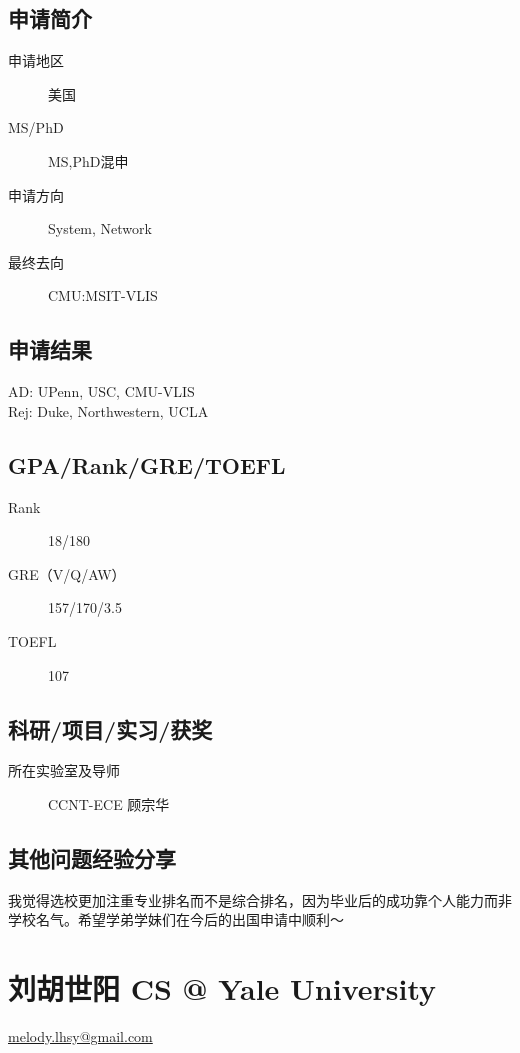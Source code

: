 \documentclass[11pt,fleqn,openany]{book} %
\begin{document}
\noindent\begin{minipage}[t]{0.45\textwidth}
\subsection*{申请简介}
\begin{description}
\item[申请地区] 美国
\item[MS/PhD] MS,PhD混申
\item[申请方向] System, Network
\item[最终去向] CMU:MSIT-VLIS
\end{description}
\end{minipage}
\hfill
\begin{minipage}[t]{0.45\textwidth}
\subsection*{申请结果}
\noindent AD: UPenn, USC, CMU-VLIS\\
Rej: Duke, Northwestern, UCLA
\end{minipage}
\subsection*{GPA/Rank/GRE/TOEFL}
\begin{description}
\item[Rank] 18/180
\item[GRE（V/Q/AW）] 157/170/3.5
\item[TOEFL] 107
\end{description}

\subsection*{科研/项目/实习/获奖}
\begin{description}
\item[所在实验室及导师] CCNT-ECE 顾宗华
\end{description}
\subsection*{其他问题经验分享}
我觉得选校更加注重专业排名而不是综合排名，因为毕业后的成功靠个人能力而非学校名气。希望学弟学妹们在今后的出国申请中顺利～
\clearpage
\section{刘胡世阳 CS @ Yale University}
\hfill \href{mailto:melody.lhsy@gmail.com}{melody.lhsy@gmail.com}
\end{document}
